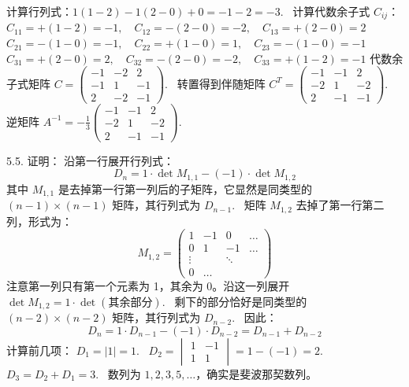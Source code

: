 \begin{exer}
计算行列式：$1(1-2) - 1(2-0) + 0 = -1 - 2 = -3$.~
计算代数余子式 $C_{ij}$：
$C_{11} = +(1-2) = -1, \quad C_{12} = -(2-0) = -2, \quad C_{13} = +(2-0) = 2$
$C_{21} = -(1-0) = -1, \quad C_{22} = +(1-0) = 1, \quad C_{23} = -(1-0) = -1$
$C_{31} = +(2-0) = 2, \quad C_{32} = -(2-0) = -2, \quad C_{33} = +(1-2) = -1$
代数余子式矩阵 $C = \begin{pmatrix} -1 & -2 & 2 \\ -1 & 1 & -1 \\ 2 & -2 & -1 \end{pmatrix}$.~
转置得到伴随矩阵 $C^T = \begin{pmatrix} -1 & -1 & 2 \\ -2 & 1 & -2 \\ 2 & -1 & -1 \end{pmatrix}$.~
逆矩阵 $A^{-1} = -\frac{1}{3} \begin{pmatrix} -1 & -1 & 2 \\ -2 & 1 & -2 \\ 2 & -1 & -1 \end{pmatrix}$.~

5.5. 证明：
沿第一行展开行列式：
$$ D_n = 1 \cdot \det M_{1,1} - (-1) \cdot \det M_{1,2} $$
其中 $M_{1,1}$ 是去掉第一行第一列后的子矩阵，它显然是同类型的 $(n-1) \times (n-1)$ 矩阵，其行列式为 $D_{n-1}$.~
矩阵 $M_{1,2}$ 去掉了第一行第二列，形式为：
$$ M_{1,2} = \begin{pmatrix} 1 & -1 & 0 & \dots \\ 0 & 1 & -1 & \dots \\ \vdots & & \ddots & \\ 0 & \dots & & \end{pmatrix} $$
注意第一列只有第一个元素为 1，其余为 0。沿这一列展开 $\det M_{1,2} = 1 \cdot \det (\text{其余部分})$.~
剩下的部分恰好是同类型的 $(n-2) \times (n-2)$ 矩阵，其行列式为 $D_{n-2}$.~
因此：
$$ D_n = 1 \cdot D_{n-1} - (-1) \cdot D_{n-2} = D_{n-1} + D_{n-2} $$
计算前几项：
$D_1 = |1| = 1$.~
$D_2 = \begin{vmatrix} 1 & -1 \\ 1 & 1 \end{vmatrix} = 1 - (-1) = 2$.~
$D_3 = D_2 + D_1 = 3$.~
数列为 $1, 2, 3, 5, \dots$，确实是斐波那契数列。


\end{exer}
